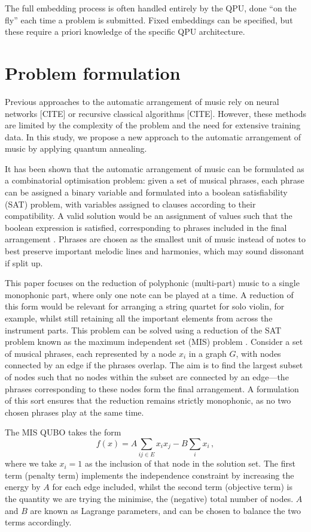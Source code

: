 \documentclass[aps,pra,10pt,twocolumn]{revtex4-2}
\begin{document}
The full embedding process is often handled entirely by the QPU, done ``on the fly'' each time a problem is submitted. Fixed embeddings can be specified, but these require a priori knowledge of the specific QPU architecture. 

\section{Problem formulation}

Previous approaches to the automatic arrangement of music rely on neural networks [CITE] or recursive classical algorithms [CITE]. However, these methods are limited by the complexity of the problem and the need for extensive training data. In this study, we propose a new approach to the automatic arrangement of music by applying quantum annealing.

It has been shown that the automatic arrangement of music can be formulated as a combinatorial optimisation problem: given a set of musical phrases, each phrase can be assigned a binary variable and formulated into a boolean satisfiability (SAT) problem, with variables assigned to clauses according to their compatibility. A valid solution would be an assignment of values such that the boolean expression is satisfied, corresponding to phrases included in the final arrangement \cite{moses_computational_2016}. Phrases are chosen as the smallest unit of music instead of notes to best preserve important melodic lines and harmonies, which may sound dissonant if split up.

This paper focuses on the reduction of polyphonic (multi-part) music to a single monophonic part, where only one note can be played at a time. A reduction of this form would be relevant for arranging a string quartet for solo violin, for example, whilst still retaining all the important elements from across the instrument parts. This problem can be solved using a reduction of the SAT problem known as the maximum independent set (MIS) problem \cite{lucas_ising_2014}. Consider a set of musical phrases, each represented by a node $x_i$ in a graph $G$, with nodes connected by an edge if the phrases overlap. The aim is to find the largest subset of nodes such that no nodes within the subset are connected by an edge—the phrases corresponding to these nodes form the final arrangement. A formulation of this sort ensures that the reduction remains strictly monophonic, as no two chosen phrases play at the same time.

The MIS QUBO takes the form
\begin{equation}
    f(x)=A\sum_{ij\in E}x_ix_j-B\sum_i x_i\,,
    \label{eq:MIS}
\end{equation}
where we take $x_i=1$ as the inclusion of that node in the solution set. The first term (penalty term) implements the independence constraint by increasing the energy by $A$ for each edge included, whilst the second term (objective term) is the quantity we are trying the minimise, the (negative) total number of nodes. $A$ and $B$ are known as Lagrange parameters, and can be chosen to balance the two terms accordingly.
\end{document}
